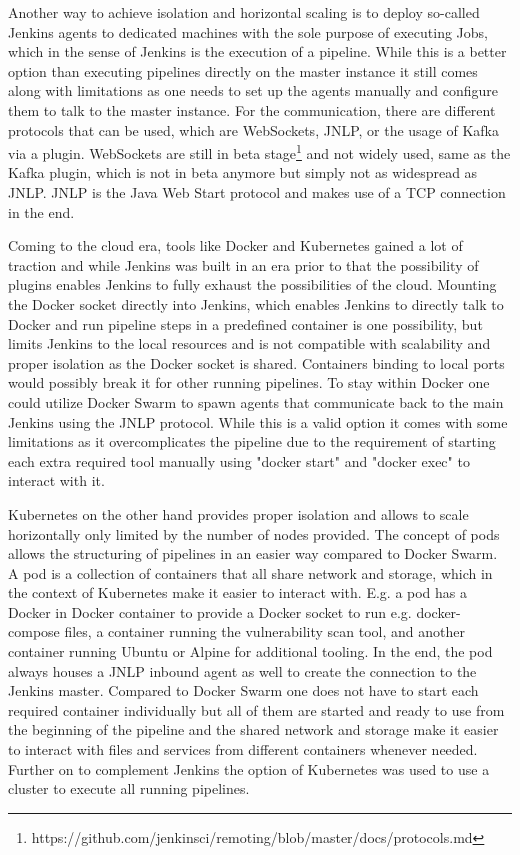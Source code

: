 Another way to achieve isolation and horizontal scaling is to deploy so-called Jenkins agents to dedicated machines with the sole purpose of executing Jobs, which in the sense of Jenkins is the execution of a pipeline. While this is a better option than executing pipelines directly on the master instance it still comes along with limitations as one needs to set up the agents manually and configure them to talk to the master instance. For the communication, there are different protocols that can be used, which are WebSockets, JNLP, or the usage of Kafka via a plugin. WebSockets are still in beta stage\footnote{https://github.com/jenkinsci/remoting/blob/master/docs/protocols.md} and not widely used, same as the Kafka plugin, which is not in beta anymore but simply not as widespread as JNLP. JNLP is the Java Web Start protocol and makes use of a TCP connection in the end.

Coming to the cloud era, tools like Docker and Kubernetes gained a lot of traction and while Jenkins was built in an era prior to that the possibility of plugins enables Jenkins to fully exhaust the possibilities of the cloud.
Mounting the Docker socket directly into Jenkins, which enables Jenkins to directly talk to Docker and run pipeline steps in a predefined container is one possibility, but limits Jenkins to the local resources and is not compatible with scalability and proper isolation as the Docker socket is shared. Containers binding to local ports would possibly break it for other running pipelines. To stay within Docker one could utilize Docker Swarm to spawn agents that communicate back to the main Jenkins using the JNLP protocol. While this is a valid option it comes with some limitations as it overcomplicates the pipeline due to the requirement of starting each extra required tool manually using "docker start" and "docker exec" to interact with it.

Kubernetes on the other hand provides proper isolation and allows to scale horizontally only limited by the number of nodes provided. The concept of pods allows the structuring of pipelines in an easier way compared to Docker Swarm. A pod is a collection of containers that all share network and storage, which in the context of Kubernetes make it easier to interact with. E.g. a pod has a Docker in Docker container to provide a Docker socket to run e.g. docker-compose files, a container running the vulnerability scan tool, and another container running Ubuntu or Alpine for additional tooling. In the end, the pod always houses a JNLP inbound agent as well to create the connection to the Jenkins master. Compared to Docker Swarm one does not have to start each required container individually but all of them are started and ready to use from the beginning of the pipeline and the shared network and storage make it easier to interact with files and services from different containers whenever needed.
Further on to complement Jenkins the option of Kubernetes was used to use a cluster to execute all running pipelines.

